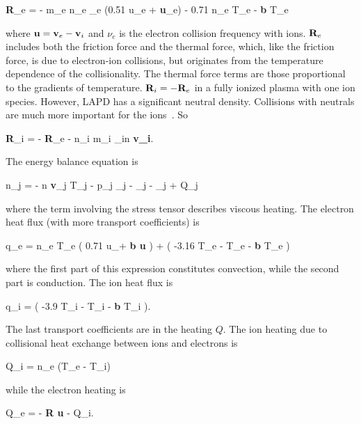 \beq
\label{R_e}
{\bf R}_e = - m_e n_e \nu_e (0.51 u_{\para e} + {\bf u}_{\perp e}) - 0.71 n_e \gradpar T_e -   {\bf b \times} \grad T_e
\eeq

where ${\bf u} = {\bf v}_e - {\bf v}_i$ and $\nu_e$ is the electron collision frequency with ions. ${\bf R}_e$ includes both the friction force and the thermal force, which, like the friction
force, is due to electron-ion collisions, but originates from the temperature dependence of the collisionality. The thermal force terms are those proportional to the gradients of temperature.
${\bf R}_i = -{\bf R}_e$ in a fully ionized plasma with one ion species. However, LAPD has a significant neutral density.
Collisions with neutrals are much more important for the ions~\cite{Popovich2010a}. So

\beq
\label{R_i}
{\bf R}_i = - {\bf R}_e - n_i m_i \nu_{in} {\bf v_i}.
\eeq

The energy balance equation is

\beq
\label{brag_ener}
 n_j  = - n {\bf v}_j \cdot \grad T_j - p_j \grad {}_j - \grad {}_j - \Pi_{j \alpha \beta}  + Q_j
\eeq

where the term involving the stress tensor describes viscous heating. The electron heat flux (with more transport coefficients) is

\beq
\label{elec_heat_flux}
q_e = n_e T_e \left( 0.71 u_\para +  {\bf b \times u} \right) +  \left( -3.16 \gradpar T_e -  \gradperp T_e -  {\bf b \times} \grad T_e \right)
\eeq

where the first part of this expression constitutes convection, while the second part is conduction. The ion heat flux is

\beq
\label{ion_heat_flux}
q_i =  \left( -3.9 \gradpar T_i -  \gradperp T_i -  {\bf b \times} \grad T_i \right).
\eeq

The last transport coefficients are in the heating $Q$. The ion heating due to collisional heat exchange between ions and electrons is

\beq
\label{ion_heat_exchange}
Q_i =  n_e \nue (T_e - T_i)
\eeq

while the electron heating is

\beq
\label{electron_heat_exchange}
Q_e = - {\bf R \cdot u} - Q_i.
\eeq

